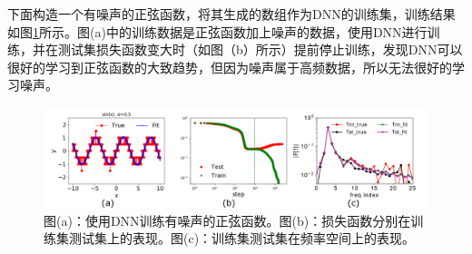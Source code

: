 下面构造一个有噪声的正弦函数，将其生成的数组作为DNN的训练集，训练结果如图\ref{fprinciple1}所示。图(a)中的训练数据是正弦函数加上噪声的数据，使用DNN进行训练，并在测试集损失函数变大时（如图（b）所示）提前停止训练，发现DNN可以很好的学习到正弦函数的大致趋势，但因为噪声属于高频数据，所以无法很好的学习噪声。

\begin{figure}[htbp!]
    \centering
    \includegraphics[width=0.98\linewidth]{figures/fprinciple/Fig3.pdf}
    \caption{图(a)：使用DNN训练有噪声的正弦函数。图(b)：损失函数分别在训练集测试集上的表现。图(c)：训练集测试集在频率空间上的表现。}
    \label{fprinciple1}
\end{figure}


